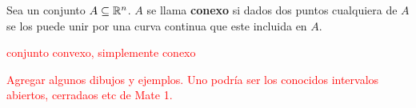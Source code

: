    
   \begin{definition}
    Sea un conjunto $A\subseteq\mathbb{R}^n$. $A$ se llama \textbf{conexo} si dados dos puntos cualquiera de $A$ se los puede unir por una curva continua que este incluida en $A$.
\end{definition}
   
   
    \begin{definition}  \textcolor{red}{conjunto convexo,   simplemente conexo}     \end{definition}
   
   
    \textcolor{red}{Agregar algunos dibujos y  ejemplos.   Uno podría ser los conocidos intervalos abiertos, cerradaos etc de Mate 1. }
   
   
   